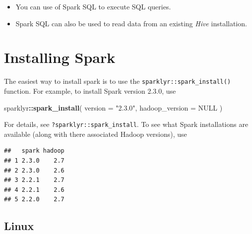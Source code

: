 \documentclass[]{book}
\newenvironment{Shaded}{\begin{snugshade}}{\end{snugshade}}
\newcommand{\CommentTok}[1]{\textcolor[rgb]{0.56,0.35,0.01}{\textit{#1}}}
\newcommand{\DataTypeTok}[1]{\textcolor[rgb]{0.13,0.29,0.53}{#1}}
\newcommand{\DecValTok}[1]{\textcolor[rgb]{0.00,0.00,0.81}{#1}}
\newcommand{\KeywordTok}[1]{\textcolor[rgb]{0.13,0.29,0.53}{\textbf{#1}}}
\newcommand{\NormalTok}[1]{#1}
\newcommand{\OperatorTok}[1]{\textcolor[rgb]{0.81,0.36,0.00}{\textbf{#1}}}
\newcommand{\OtherTok}[1]{\textcolor[rgb]{0.56,0.35,0.01}{#1}}
\newcommand{\StringTok}[1]{\textcolor[rgb]{0.31,0.60,0.02}{#1}}
\theoremstyle{definition}
\theoremstyle{definition}
\theoremstyle{definition}
\theoremstyle{remark}
\begin{document}
\begin{itemize}
\item
  You can use of Spark SQL to execute SQL queries.
\item
  Spark SQL can also be used to read data from an existing \emph{Hive}
  installation.
\end{itemize}

\hypertarget{installing-spark}{%
\section{Installing Spark}\label{installing-spark}}

The easiest way to install spark is to use the
\texttt{sparklyr::spark\_install()} function. For example, to install
Spark version 2.3.0, use

\begin{Shaded}
\begin{Highlighting}[]
\NormalTok{sparklyr}\OperatorTok{::}\KeywordTok{spark_install}\NormalTok{(}
  \DataTypeTok{version =} \StringTok{"2.3.0"}\NormalTok{,}
  \DataTypeTok{hadoop_version =} \OtherTok{NULL}
\NormalTok{)}
\end{Highlighting}
\end{Shaded}

For details, see \texttt{?sparklyr::spark\_install}. To see what Spark
installations are available (along with there associated Hadoop
versions), use

\begin{Shaded}
\end{Shaded}

\begin{verbatim}
##   spark hadoop
## 1 2.3.0    2.7
## 2 2.3.0    2.6
## 3 2.2.1    2.7
## 4 2.2.1    2.6
## 5 2.2.0    2.7
\end{verbatim}

\hypertarget{linux}{%
\subsection{Linux}\label{linux}}
\end{document}
